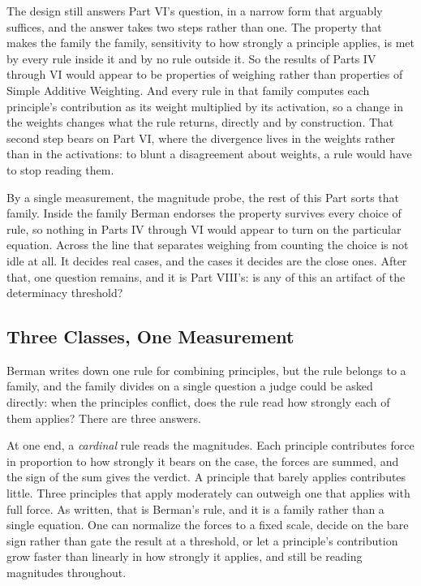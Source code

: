 The design still answers Part VI's question, in a narrow form that arguably
suffices, and the answer takes two steps rather than one. The property that
makes the family the family, sensitivity to how strongly a principle
applies, is met by every rule inside it and by no rule outside it. So the
results of Parts IV through VI would appear to be properties of weighing
rather than properties of Simple Additive Weighting. And every rule in that family computes each
principle's contribution as its weight multiplied by its activation, so a
change in the weights changes what the rule returns, directly and by
construction. That second step bears on Part VI, where the divergence
lives in the weights rather than in the activations: to blunt a
disagreement about weights, a rule would have to stop reading them.

By a single measurement, the magnitude probe, the rest of this Part sorts
that family. Inside the family Berman endorses the property survives every choice of
rule, so nothing in Parts IV through VI would appear to turn on the
particular equation. Across the line that
separates weighing from counting the choice is not idle at all. It decides
real cases, and the cases it decides are the close ones. After that, one
question remains, and it is Part VIII's: is any of this an artifact of the
determinacy threshold?

\subsection{Three Classes, One Measurement}

Berman writes down one rule for combining principles, but the rule
belongs to a family, and the family divides on a single question a judge
could be asked directly: when the principles conflict, does the rule read
how strongly each of them applies? There are three answers.

At one end, a \textit{cardinal} rule reads the magnitudes. Each principle contributes
force in proportion to how strongly it bears on the case, the forces are
summed, and the sign of the sum gives the verdict. A principle that barely applies contributes little. Three principles that
apply moderately can outweigh one that applies with full force. As written,
that is Berman's rule, and it is a family rather than a single equation. One can normalize the
forces to a fixed scale, decide on the bare sign rather than gate the
result at a threshold, or let a principle's contribution grow faster than linearly in how strongly
it applies, and still be reading magnitudes throughout.

